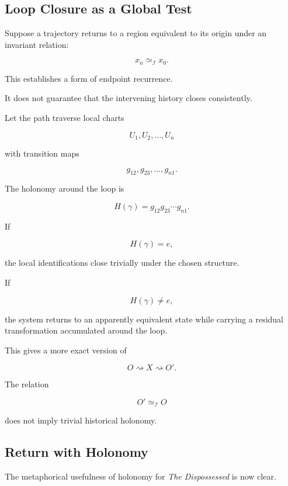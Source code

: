 \documentclass[
  11pt,
  a4paper,
  DIV=12,
  BCOR=0mm,
  parskip=half-
]{scrartcl}
\newcommand{\Inv}{\mathcal I}
\newcommand{\simI}{\simeq_{\Inv}}
\theoremstyle{definition}
\theoremstyle{plain}
\theoremstyle{remark}
\begin{document}
\subsection{Loop Closure as a Global Test}
\label{app:loop-closure}

Suppose a trajectory returns to a region equivalent to its origin under an
invariant relation:

\[
  x_n\simI x_0.
\]

This establishes a form of endpoint recurrence.

It does not guarantee that the intervening history closes consistently.

Let the path traverse local charts

\[
  U_1,U_2,\ldots,U_n
\]

with transition maps

\[
  g_{12},
  g_{23},
  \ldots,
  g_{n1}.
\]

The holonomy around the loop is

\[
  H(\gamma)
  =
  g_{12}
  g_{23}
  \cdots
  g_{n1}.
\]

If

\[
  H(\gamma)=e,
\]

the local identifications close trivially under the chosen structure.

If

\[
  H(\gamma)\neq e,
\]

the system returns to an apparently equivalent state while carrying a residual
transformation accumulated around the loop.

This gives a more exact version of

\[
  O\rightsquigarrow X\rightsquigarrow O'.
\]

The relation

\[
  O'\simI O
\]

does not imply trivial historical holonomy.


\subsection{Return with Holonomy}
\label{app:leguin-holonomy}

The metaphorical usefulness of holonomy for \emph{The Dispossessed} is now
clear.
\end{document}
